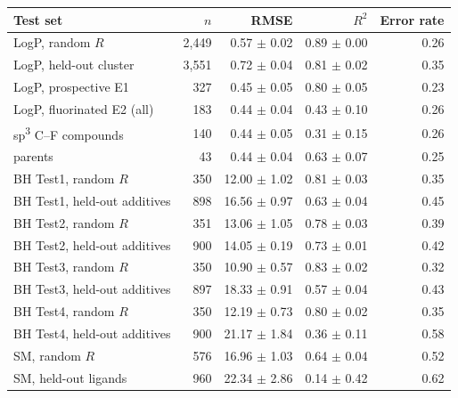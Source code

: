 \begin{tabular}{@{}lrrrr@{}}
\toprule
Test set & $n$ & RMSE & $R^2$ & Error rate \\
\midrule
LogP, random $R$ & 2,449 & 0.57 $\pm$ 0.02 & 0.89 $\pm$ 0.00 & 0.26 \\
LogP, held-out cluster & 3,551 & 0.72 $\pm$ 0.04 & 0.81 $\pm$ 0.02 & 0.35 \\
LogP, prospective E1 & 327 & 0.45 $\pm$ 0.05 & 0.80 $\pm$ 0.05 & 0.23 \\
LogP, fluorinated E2 (all) & 183 & 0.44 $\pm$ 0.04 & 0.43 $\pm$ 0.10 & 0.26 \\
\quad sp\textsuperscript{3} C--F compounds & 140 & 0.44 $\pm$ 0.05 & 0.31 $\pm$ 0.15 & 0.26 \\
\quad parents & 43 & 0.44 $\pm$ 0.04 & 0.63 $\pm$ 0.07 & 0.25 \\
\addlinespace
BH Test1, random $R$ & 350 & 12.00 $\pm$ 1.02 & 0.81 $\pm$ 0.03 & 0.35 \\
BH Test1, held-out additives & 898 & 16.56 $\pm$ 0.97 & 0.63 $\pm$ 0.04 & 0.45 \\
BH Test2, random $R$ & 351 & 13.06 $\pm$ 1.05 & 0.78 $\pm$ 0.03 & 0.39 \\
BH Test2, held-out additives & 900 & 14.05 $\pm$ 0.19 & 0.73 $\pm$ 0.01 & 0.42 \\
BH Test3, random $R$ & 350 & 10.90 $\pm$ 0.57 & 0.83 $\pm$ 0.02 & 0.32 \\
BH Test3, held-out additives & 897 & 18.33 $\pm$ 0.91 & 0.57 $\pm$ 0.04 & 0.43 \\
BH Test4, random $R$ & 350 & 12.19 $\pm$ 0.73 & 0.80 $\pm$ 0.02 & 0.35 \\
BH Test4, held-out additives & 900 & 21.17 $\pm$ 1.84 & 0.36 $\pm$ 0.11 & 0.58 \\
\addlinespace
SM, random $R$ & 576 & 16.96 $\pm$ 1.03 & 0.64 $\pm$ 0.04 & 0.52 \\
SM, held-out ligands & 960 & 22.34 $\pm$ 2.86 & 0.14 $\pm$ 0.42 & 0.62 \\
\bottomrule
\end{tabular}